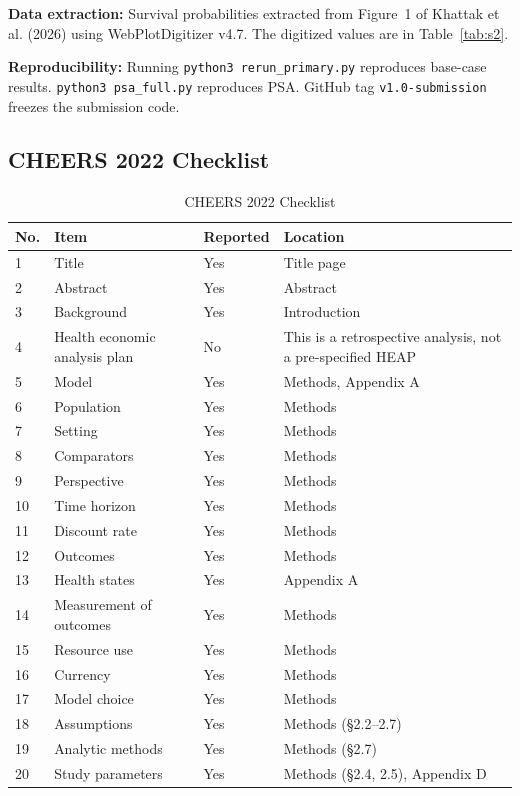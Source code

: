 \documentclass[11pt,a4paper]{article}
\begin{document}
\textbf{Data extraction:} Survival probabilities extracted from Figure~1 of Khattak et al. (2026) using WebPlotDigitizer v4.7. The digitized values are in Table~\ref{tab:s2}.

\textbf{Reproducibility:} Running \texttt{python3 rerun\_primary.py} reproduces base-case results. \texttt{python3 psa\_full.py} reproduces PSA. GitHub tag \texttt{v1.0-submission} freezes the submission code.

\subsection{CHEERS 2022 Checklist}
\label{sec:cheers}
\begin{table}[H]
\centering
\caption{CHEERS 2022 Checklist}
\label{tab:cheers}
\begin{tabularx}{\linewidth}{@{}p{0.7cm}X p{1.6cm}X@{}}
\toprule
\textbf{No.} & \textbf{Item} & {\scriptsize\textbf{Reported}} & \textbf{Location} \\
\midrule
1 & Title & Yes & Title page \\
2 & Abstract & Yes & Abstract \\
3 & Background & Yes & Introduction \\
4 & Health economic analysis plan & No & This is a retrospective analysis, not a pre-specified HEAP \\
5 & Model & Yes & Methods, Appendix A \\
6 & Population & Yes & Methods \\
7 & Setting & Yes & Methods \\
8 & Comparators & Yes & Methods \\
9 & Perspective & Yes & Methods \\
10 & Time horizon & Yes & Methods \\
11 & Discount rate & Yes & Methods \\
12 & Outcomes & Yes & Methods \\
13 & Health states & Yes & Appendix A \\
14 & Measurement of outcomes & Yes & Methods \\
15 & Resource use & Yes & Methods \\
16 & Currency & Yes & Methods \\
17 & Model choice & Yes & Methods \\
18 & Assumptions & Yes & Methods ({\S}2.2--2.7) \\
19 & Analytic methods & Yes & Methods ({\S}2.7) \\
20 & Study parameters & Yes & Methods ({\S}2.4, 2.5), Appendix D \\

\end{tabularx}
\end{table}
\end{document}
